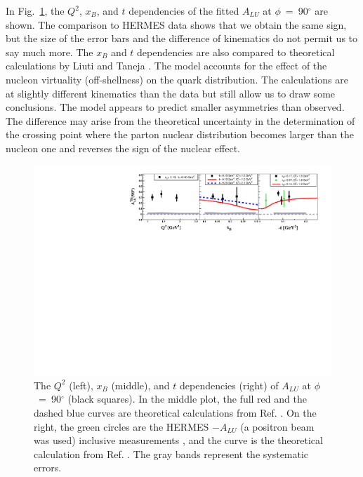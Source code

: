 \documentclass[twocolumn,nofootinbib,prl,superscriptaddress,secnumarabic,amssymb,nobibnotes,aps,floatfix]{revtex4}
\begin{document}
In Fig.~\ref{fig:alu90}, the $Q^2$, $x_{B}$, and $t$ dependencies of the fitted 
$A_{LU}$ at $\phi$~=~90$^{\circ}$ are shown. The comparison to HERMES data
shows that we obtain the same sign, but the size of the error bars and the difference
of kinematics do not permit us to say much more. The $x_{B}$ and $t$ 
dependencies are also compared to theoretical calculations by Liuti and Taneja 
\cite{simonetta_2}. The model accounts for the effect of the nucleon virtuality 
(off-shellness) on the quark distribution. The calculations are at slightly 
different kinematics than the data but still allow us to draw some conclusions.  
The model appears to predict smaller asymmetries than observed. The difference 
may arise from the theoretical uncertainty in the determination of the crossing 
point where the parton nuclear distribution becomes larger than the nucleon one 
and reverses the sign of the nuclear effect.

\begin{figure}[tb]
\includegraphics[width=16cm]{F_Coherent_ALU_phi_90.pdf}
\caption{The $Q^{2}$ (left), $x_{B}$ (middle), and $t$ dependencies (right) of
   $A_{LU}$ at $\phi$~=~90$^{\circ}$ (black squares). In the middle plot, the 
   full red and the dashed blue curves are theoretical calculations from Ref.  
   \cite{simonetta_2}. On the right, the green circles are the HERMES $-A_{LU}$ 
(a positron beam was used) inclusive measurements \cite{Airapetian:2010nu}, and 
the curve is the theoretical calculation from Ref. \cite{simonetta_2}. The gray 
bands represent the systematic errors.}
\label{fig:alu90}
\end{figure}
\end{document}
